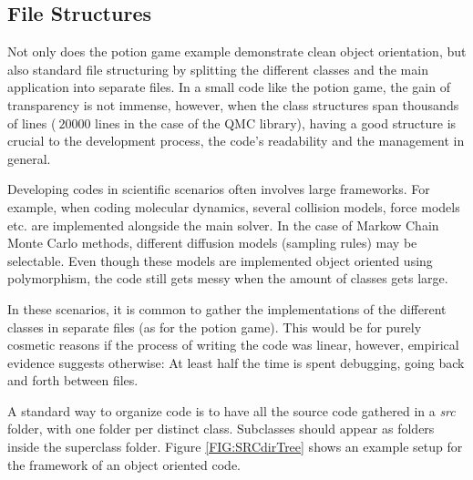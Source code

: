 \subsection{File Structures}

Not only does the potion game example demonstrate clean object orientation, but also standard file structuring by splitting the different classes and the main application into separate files. In a small code like the potion game, the gain of transparency is not immense, however, when the class structures span thousands of lines ($~ 20 000$ lines in the case of the QMC library), having a good structure is crucial to the development process, the code's readability and the management in general.

Developing codes in scientific scenarios often involves large frameworks. For example, when coding molecular dynamics, several collision models, force models etc. are implemented alongside the main solver. In the case of Markow Chain Monte Carlo methods, different diffusion models (sampling rules) may be selectable. Even though these models are implemented object oriented using polymorphism, the code still gets messy when the amount of classes  gets large. 

In these scenarios, it is common to gather the implementations of the different classes in separate files (as for the potion game). This would be for purely cosmetic reasons if the process of writing the code was linear, however, empirical evidence suggests otherwise: At least half the time is spent debugging, going back and forth between files. 

A standard way to organize code is to have all the source code gathered in a \textit{src} folder, with one folder per distinct class. Subclasses should appear as folders inside the superclass folder. Figure \ref{FIG:SRCdirTree} shows an example setup for the framework of an object oriented code.

